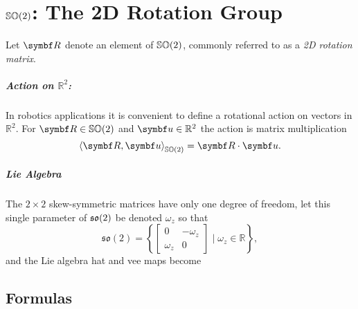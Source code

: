 \chapter{\texorpdfstring{${\mathbb{SO}(2)}$}{SO(2)}: The 2D Rotation Group}

Let $\bR$ denote an element of ${\mathbb{SO}(2)}$, commonly referred to as a \emph{2D rotation matrix}.

\paragraph{Action on \texorpdfstring{$\mathbb{R}^2$}{R2}:}
In robotics applications it is convenient to define a rotational action on vectors in $\mathbb{R}^2$. For $\bR \in \SOtwo$ and $\bu \in \mathbb{R}^2$ the action is matrix multiplication
\begin{equation}
  \left \langle \bR, \bu \right \rangle_{\SOtwo} = \bR \cdot \bu.
\end{equation}

\paragraph{Lie Algebra}

The $2 \times 2$ skew-symmetric matrices have only one degree of freedom, let this single parameter of ${\mathfrak{so}(2)}$ be denoted $\omega_z$ so that
\begin{equation}
  \mathfrak{so}(2) = \left\{ \begin{bmatrix} 0 & -\omega_z \\ \omega_z & 0 \end{bmatrix} \mid \omega_z \in \mathbb{R} \right\},
\end{equation}
and the Lie algebra hat and vee maps become
\begin{center}
\end{center}

\section{Formulas}


